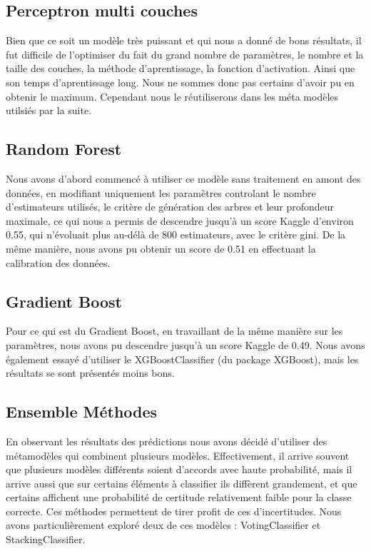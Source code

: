 \documentclass[twocolumn,10pt]{article}
\begin{document}
    \subsection{Perceptron multi couches}
        Bien que ce soit un modèle très puissant et qui nous a donné de bons résultats, il fut difficile de l'optimiser du fait du grand nombre de paramètres, le nombre et la taille des couches, la méthode d'aprentissage, la fonction d'activation. Ainsi que son temps d'aprentissage long. Nous ne sommes donc pas certains d'avoir pu en obtenir le maximum. Cependant nous le réutiliserons dans les méta modèles utilsiés par la suite. 
    
    \subsection{Random Forest}
    Nous avons d'abord commencé à utiliser ce modèle sans traitement en amont des données, en modifiant uniquement les paramètres controlant le nombre d'estimateurs utilisés, le critère de génération des arbres et leur profondeur maximale, ce qui nous a permis de descendre jusqu'à un score Kaggle d'environ 0.55, qui n'évoluait plus au-délà de 800 estimateurs, avec le critère gini.
    De la même manière, nous avons pu obtenir un score de 0.51 en effectuant la calibration des données.
    
    \subsection{Gradient Boost}
    Pour ce qui est du Gradient Boost, en travaillant de la même manière sur les paramètres, nous avons pu descendre jusqu'à un score Kaggle de 0.49. Nous avons également essayé d'utiliser le XGBoostClassifier (du package XGBoost), mais les résultats se sont présentés moins bons.
    
    \subsection{Ensemble Méthodes}
        En observant les résultats des prédictions nous avons décidé d'utiliser des métamodèles qui combinent plusieurs modèles. Effectivement, il arrive souvent que plusieurs modèles différents soient d'accords avec haute probabilité, mais il arrive aussi que sur certains éléments à classifier ils diffèrent grandement, et que certains affichent une probabilité de certitude relativement faible pour la classe correcte. Ces méthodes permettent de tirer profit de ces d'incertitudes. Nous avons particulièrement exploré deux de ces modèles : VotingClassifier et StackingClassifier.
\end{document}
